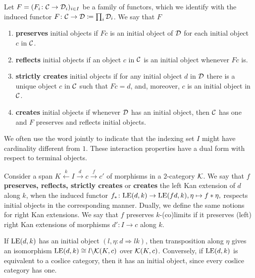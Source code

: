 \begin{definition}
   Let $F = (F_i\colon\mathcal{C}\to \mathcal{D}_i)_{i\in I}$ be a family of functors, which we identify with the induced functor $F\colon \mathcal{C}\to \mathcal{D}\coloneqq \prod_i\mathcal{D}_i$. We say that $F$
   \begin{enumerate}
       \item \textbf{preserves} initial objects if $Fc$ is an initial object of $\mathcal{D}$ for each initial object $c$ in $\mathcal{C}$.
       \item \textbf{reflects} initial objects if an object $c$ in $\mathcal{C}$ is an initial object whenever $Fc$ is.
       \item \textbf{strictly creates} initial objects if for any initial object $d$ in $\mathcal{D}$ there is a unique object $c$ in $\mathcal{C}$ such that $Fc = d$, and, moreover, $c$ is an initial object in $\mathcal{C}$.
       \item \textbf{creates} initial objects if whenever $\mathcal{D}$ has an initial object, then $\mathcal{C}$ has one and $F$ preserves and reflects initial objects.
   \end{enumerate}
   We often use the word jointly to indicate that the indexing set $I$ might have cardinality different from $1$. These interaction properties have a dual form with respect to terminal objects.
\end{definition}
\begin{definition}
   Consider a span $K\xleftarrow{k}I\xrightarrow{d}c\xrightarrow{f}c'$ of morphisms in a $2$-category $\mathcal{K}$. We say that $f$ \textbf{preserves, reflects, strictly creates} or \textbf{creates} the left Kan extension of $d$ along $k$, when the induced functor $f_*\colon \mathrm{LE}(d,k)\to \mathrm{LE}(fd,k), \eta\mapsto f*\eta,$ respects initial objects in the corresponding manner. Dually, we define the same notions for right Kan extensions. We say that $f$ preserves $k$-(co)limits if it preserves (left) right Kan extensions of morphisms $d'\colon I\to c$ along $k$.
\end{definition}

\begin{remark}
    If $\mathrm{LE}(d,k)$ has an initial object $(l,\eta\colon d\Rightarrow lk)$, then transposition along $\eta$ gives an isomorphism $\mathrm{LE}(d,k)\cong l\backslash \mathcal{K}(K,c)$ over $\mathcal{K}(K,c)$. Conversely, if $\mathrm{LE}(d,k)$ is equivalent to a coslice category, then it has an initial object, since every coslice category has one.
\end{remark}

